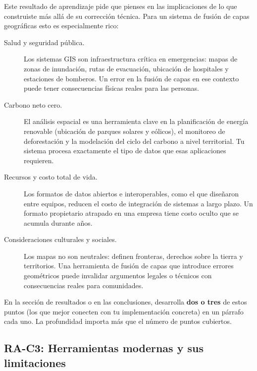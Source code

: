 \documentclass[12pt, oneside]{article}
\begin{document}
Este resultado de aprendizaje pide que pienses en las implicaciones de
lo que construiste más allá de su corrección técnica.  Para un sistema
de fusión de capas geográficas esto es especialmente rico:

\begin{description}
  \item[Salud y seguridad pública.]
    Los sistemas GIS son infraestructura crítica en emergencias:
    mapas de zonas de inundación, rutas de evacuación, ubicación de
    hospitales y estaciones de bomberos.  Un error en la fusión de
    capas en ese contexto puede tener consecuencias físicas reales
    para las personas.

  \item[Carbono neto cero.]
    El análisis espacial es una herramienta clave en la planificación
    de energía renovable (ubicación de parques solares y eólicos),
    el monitoreo de deforestación y la modelación del ciclo del carbono
    a nivel territorial.  Tu sistema procesa exactamente el tipo de
    datos que esas aplicaciones requieren.

  \item[Recursos y costo total de vida.]
    Los formatos de datos abiertos e interoperables, como el que
    diseñaron entre equipos, reducen el costo de integración de
    sistemas a largo plazo.  Un formato propietario atrapado en una
    empresa tiene costo oculto que se acumula durante años.

  \item[Consideraciones culturales y sociales.]
    Los mapas no son neutrales: definen fronteras, derechos sobre
    la tierra y territorios.  Una herramienta de fusión de capas que
    introduce errores geométricos puede invalidar argumentos legales
    o técnicos con consecuencias reales para comunidades.
\end{description}

\begin{consejo}
  En la sección de resultados o en las conclusiones, desarrolla
  \textbf{dos o tres} de estos puntos (los que mejor conecten con
  tu implementación concreta) en un párrafo cada uno.  La profundidad
  importa más que el número de puntos cubiertos.
\end{consejo}

\subsection{RA-C3: Herramientas modernas y sus limitaciones}
\end{document}
